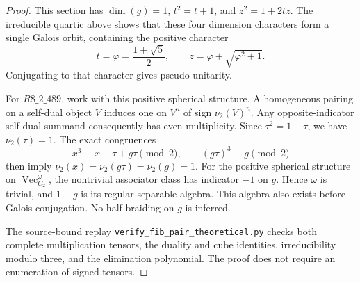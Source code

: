 \begin{proof}
This section has $\dim(g)=1$, $t^2=t+1$, and $z^2=1+2tz$.
The irreducible quartic above shows that these four dimension
characters form a single Galois orbit, containing the positive
character
\[
t=\varphi=\frac{1+\sqrt5}{2},\qquad
z=\varphi+\sqrt{\varphi^2+1}.
\]
Conjugating to that character gives pseudo-unitarity.

For $R8\_2\_489$, work with this positive spherical structure.
A homogeneous pairing on a self-dual object $V$ induces one on
$V^n$ of sign $\nu_2(V)^n$. Any opposite-indicator self-dual
summand consequently has even multiplicity. Since
$\tau^2=1+\tau$, we have $\nu_2(\tau)=1$. The exact congruences
\[
x^3\equiv x+\tau+g\tau\pmod2,\qquad
(g\tau)^3\equiv g\pmod2
\]
then imply $\nu_2(x)=\nu_2(g\tau)=\nu_2(g)=1$.
For the positive spherical structure on
$\operatorname{Vec}_{C_2}^{\omega}$, the nontrivial associator
class has indicator $-1$ on $g$. Hence $\omega$ is trivial,
and $1+g$ is its regular separable algebra. This algebra also
exists before Galois conjugation. No half-braiding on $g$ is
inferred.

The source-bound replay
\texttt{verify\_fib\_pair\_theoretical.py} checks both complete
multiplication tensors, the duality and cube identities,
irreducibility modulo three, and the elimination polynomial.
The proof does not require an enumeration of signed tensors.
\end{proof}


